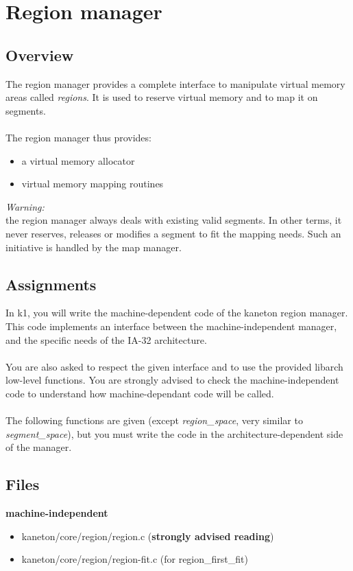 %
%

\newpage

\section{Region manager}
\subsection*{Overview}
The region manager provides a complete interface to manipulate virtual memory
areas called {\em regions}. It is used to reserve virtual memory and to map it
on segments.\\
\\
The region manager thus provides:

\begin{itemize}
\item a virtual memory allocator
\item virtual memory mapping routines\\
\end{itemize}

{\em Warning:}\\
the region manager always deals with existing valid segments. In
other terms, it never reserves, releases or modifies a segment to fit the mapping
needs. Such an initiative is handled by the map manager.\\

\subsection*{Assignments}
In k1, you will write the machine-dependent code of the kaneton region manager.
This code implements an interface between the machine-independent manager, and
the specific needs of the IA-32 architecture.
\\ \\
You are also asked to respect the given interface and to use the provided
libarch low-level functions. You are strongly advised to check the machine-independent code to
understand how machine-dependant code will be called.
\\ \\
The following functions are given (except \emph{region\_space}, very similar to \emph{segment\_space}), but you must write the code in
the architecture-dependent side of the manager.

\subsection*{Files}
{\color{filerefcolor} \textbf{machine-independent}}
\begin{itemize}
\item kaneton/core/region/region.c (\textbf{strongly advised reading})
\item kaneton/core/region/region-fit.c (for region\_first\_fit)
\end{itemize}

